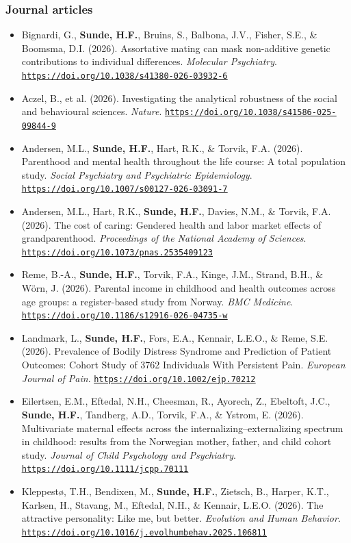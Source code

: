 \documentclass[10pt,a4paper]{article}
\let\cvhref\href
\renewcommand{\href}[2]{\cvhref{#1}{\underline{#2}}}%
\renewcommand{\url}[1]{\href{#1}{\nolinkurl{#1}}}%
\begin{document}
\subsubsection*{Journal articles}
\begin{itemize}
\item Bignardi, G., \textbf{Sunde, H.F.}, Bruins, S., Balbona, J.V., Fisher, S.E., \& Boomsma, D.I. (2026). Assortative mating can mask non-additive genetic contributions to individual differences. \textit{Molecular Psychiatry}. \url{https://doi.org/10.1038/s41380-026-03932-6}
\item Aczel, B., et al. (2026). Investigating the analytical robustness of the social and behavioural sciences. \textit{Nature}. \url{https://doi.org/10.1038/s41586-025-09844-9}
\item Andersen, M.L., \textbf{Sunde, H.F.}, Hart, R.K., \& Torvik, F.A. (2026). Parenthood and mental health throughout the life course: A total population study. \textit{Social Psychiatry and Psychiatric Epidemiology}. \url{https://doi.org/10.1007/s00127-026-03091-7}
\item Andersen, M.L., Hart, R.K., \textbf{Sunde, H.F.}, Davies, N.M., \& Torvik, F.A. (2026). The cost of caring: Gendered health and labor market effects of grandparenthood. \textit{Proceedings of the National Academy of Sciences}. \url{https://doi.org/10.1073/pnas.2535409123}
\item Reme, B.-A., \textbf{Sunde, H.F.}, Torvik, F.A., Kinge, J.M., Strand, B.H., \& Wörn, J. (2026). Parental income in childhood and health outcomes across age groups: a register-based study from Norway. \textit{BMC Medicine}. \url{https://doi.org/10.1186/s12916-026-04735-w}
\item Landmark, L., \textbf{Sunde, H.F.}, Fors, E.A., Kennair, L.E.O., \& Reme, S.E. (2026). Prevalence of Bodily Distress Syndrome and Prediction of Patient Outcomes: Cohort Study of 3762 Individuals With Persistent Pain. \textit{European Journal of Pain}. \url{https://doi.org/10.1002/ejp.70212}
\item Eilertsen, E.M., Eftedal, N.H., Cheesman, R., Ayorech, Z., Ebeltoft, J.C., \textbf{Sunde, H.F.}, Tandberg, A.D., Torvik, F.A., \& Ystrom, E. (2026). Multivariate maternal effects across the internalizing--externalizing spectrum in childhood: results from the Norwegian mother, father, and child cohort study. \textit{Journal of Child Psychology and Psychiatry}. \url{https://doi.org/10.1111/jcpp.70111}
\item Kleppestø, T.H., Bendixen, M., \textbf{Sunde, H.F.}, Zietsch, B., Harper, K.T., Karlsen, H., Stavang, M., Eftedal, N.H., \& Kennair, L.E.O. (2026). The attractive personality: Like me, but better. \textit{Evolution and Human Behavior}. \url{https://doi.org/10.1016/j.evolhumbehav.2025.106811}

\end{itemize}
\end{document}
